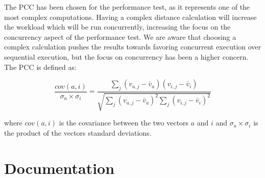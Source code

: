 The \ac{PCC} has been chosen for the performance test, as it represents one of the most complex computations. Having a complex distance calculation will increase the workload which will be run concurrently, increasing the focus on the concurrency aspect of the performance test. We are aware that choosing a complex calculation pushes the results towards favoring concurrent execution over sequential execution, but the focus on concurrency has been a higher concern. The \ac{PCC} is defined as:

\begin{equation}\label{pearsonverbose}
\frac{cov(a,i)}{\sigma_a \times \sigma_i} = \frac{\sum_j(v_{a,j}-\bar{v}_a)(v_{i,j}-\bar{v}_i)}{\sqrt{{\sum_j}(v_{a,j}-\bar{v}_a)^2 \sum_j(v_{i,j}-\bar{v}_i)^2}}
\end{equation}

where $cov(a,i)$ is the covariance between the two vectors $a$ and $i$ and $\sigma_a \times \sigma_i$ is the product of the vectors standard deviations.


\section{Documentation}


\worksheetend